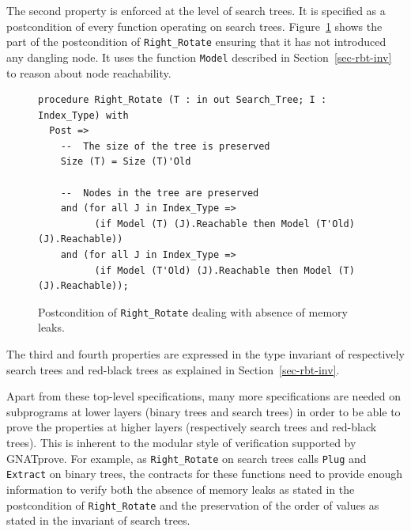 \documentclass{llncs}
\newcommand{\gnatprove}{GNATprove\xspace}
\begin{document}
The second property is enforced at the level of search trees. It is specified
as a postcondition of every function operating on search trees.
Figure~\ref{fig-spec-no-leak} shows the part of the postcondition of
\texttt{Right\_Rotate} ensuring that it has not introduced any dangling
node. It uses the function \texttt{Model} described in
Section~\ref{sec-rbt-inv} to reason about node reachability.

\begin{figure}[ht]
\begin{small}
\begin{lstlisting}
procedure Right_Rotate (T : in out Search_Tree; I : Index_Type) with
  Post =>
    --  The size of the tree is preserved
    Size (T) = Size (T)'Old

    --  Nodes in the tree are preserved
    and (for all J in Index_Type =>
          (if Model (T) (J).Reachable then Model (T'Old) (J).Reachable))
    and (for all J in Index_Type =>
          (if Model (T'Old) (J).Reachable then Model (T) (J).Reachable));
\end{lstlisting}
\end{small}
\caption{\label{fig-spec-no-leak} Postcondition of \texttt{Right\_Rotate} dealing with absence of memory leaks.}
\end{figure}

The third and fourth properties are expressed in the type invariant of
respectively search trees and red-black trees as explained in
Section~\ref{sec-rbt-inv}.

Apart from these top-level specifications, many more specifications are needed
on subprograms at lower layers (binary trees and search trees) in order to be
able to prove the properties at higher layers (respectively search trees and
red-black trees). This is inherent to the modular style of verification
supported by \gnatprove. For example, as \texttt{Right\_Rotate} on search trees
calls \texttt{Plug} and \texttt{Extract} on binary trees, the contracts for
these functions need to provide enough information to verify both the absence
of memory leaks as stated in the postcondition of \texttt{Right\_Rotate} and
the preservation of the order of values as stated in the invariant of search
trees.


\end{document}
